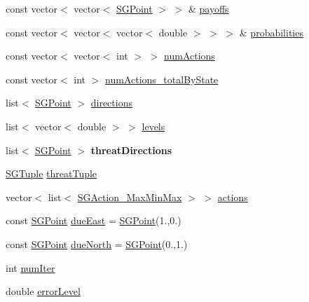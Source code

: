 \begin{DoxyCompactItemize}
\item 
const vector$<$ vector$<$ \hyperlink{classSGPoint}{S\+G\+Point} $>$ $>$ \& \hyperlink{classSGSolver__MaxMinMax__3Player_ad6f00da3d3d152221cb0f66fe06dad15}{payoffs}
\item 
const vector$<$ vector$<$ vector$<$ double $>$ $>$ $>$ \& \hyperlink{classSGSolver__MaxMinMax__3Player_ae07f2726d67a2add5ebffc21b98ce6db}{probabilities}
\item 
const vector$<$ vector$<$ int $>$ $>$ \hyperlink{classSGSolver__MaxMinMax__3Player_a0f67396d7ccbb5a4c71be0d75c9f9f79}{num\+Actions}
\item 
const vector$<$ int $>$ \hyperlink{classSGSolver__MaxMinMax__3Player_a7da97117d0d8dd9bfd739ee312513c64}{num\+Actions\+\_\+total\+By\+State}
\item 
list$<$ \hyperlink{classSGPoint}{S\+G\+Point} $>$ \hyperlink{classSGSolver__MaxMinMax__3Player_a425f29490157693d4ef6ed99426748e9}{directions}
\item 
list$<$ vector$<$ double $>$ $>$ \hyperlink{classSGSolver__MaxMinMax__3Player_a17baa3765d6322cb02180ec6d36bdb32}{levels}
\item 
\mbox{\label{classSGSolver__MaxMinMax__3Player_adac41858f6d41df62468c442dd83026c}} 
list$<$ \hyperlink{classSGPoint}{S\+G\+Point} $>$ {\bfseries threat\+Directions}
\item 
\hyperlink{classSGTuple}{S\+G\+Tuple} \hyperlink{classSGSolver__MaxMinMax__3Player_a52695bd70d1ed1ab7f7dc647793b3bca}{threat\+Tuple}
\item 
vector$<$ list$<$ \hyperlink{classSGAction__MaxMinMax}{S\+G\+Action\+\_\+\+Max\+Min\+Max} $>$ $>$ \hyperlink{classSGSolver__MaxMinMax__3Player_ace3cdb3d3a60e9c43d0a23e8d716080a}{actions}
\item 
const \hyperlink{classSGPoint}{S\+G\+Point} \hyperlink{classSGSolver__MaxMinMax__3Player_a86a939a201068b945866a0e101d5a57d}{due\+East} = \hyperlink{classSGPoint}{S\+G\+Point}(1.,0.)
\item 
const \hyperlink{classSGPoint}{S\+G\+Point} \hyperlink{classSGSolver__MaxMinMax__3Player_a7d6cc8a0cb8709770b5a99be19bb9c23}{due\+North} = \hyperlink{classSGPoint}{S\+G\+Point}(0.,1.)
\item 
int \hyperlink{classSGSolver__MaxMinMax__3Player_a148ff6b6d52a4cdac99557e37045c854}{num\+Iter}
\item 
double \hyperlink{classSGSolver__MaxMinMax__3Player_a44785ad4ffac44b7110bda0b9f20bc53}{error\+Level}

\end{DoxyCompactItemize}
